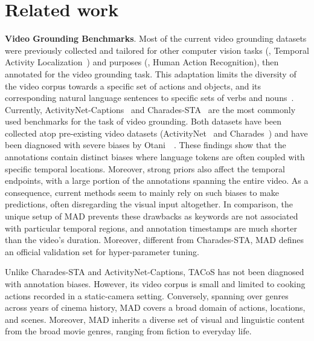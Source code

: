 \documentclass[10pt,twocolumn,letterpaper]{article}
\renewcommand{\paragraph}[1]{\vspace{1mm}\noindent\textbf{#1}.}
\begin{document}
 \section{Related work}\label{sec: related}

\paragraph{Video Grounding Benchmarks}
Most of the current video grounding datasets were previously collected and tailored for other computer vision tasks (\ie, Temporal Activity Localization~\cite{7298698, TACoS_ACL_2013}) and purposes (\ie, Human Action Recognition), then annotated for the video grounding task. This adaptation limits the diversity of the video corpus towards a specific set of actions and objects, and its corresponding natural language sentences to specific sets of verbs and nouns~\cite{rohrbach2014coherent, Krishna_2017_ICCV, Gao_2017_ICCV, otani2020challengesmr}. Currently, ActivityNet-Captions~\cite{Krishna_2017_ICCV} and Charades-STA~\cite{Gao_2017_ICCV} are the most commonly used benchmarks for the task of video grounding. Both datasets have been collected atop pre-existing video datasets (ActivityNet~\cite{7298698} and Charades~\cite{10.1007/978-3-319-46448-0_31}) and have been diagnosed with severe biases by Otani~\etal~\cite{otani2020challengesmr}. These findings show that the annotations contain distinct biases where language tokens are often coupled with specific temporal locations. Moreover, strong priors also affect the temporal endpoints, with a large portion of the annotations spanning the entire video. As a consequence, current methods seem to mainly rely on such biases to make predictions, often disregarding the visual input altogether. In comparison, the unique setup of MAD prevents these drawbacks as keywords are not associated with particular temporal regions, and annotation timestamps are much shorter than the video's duration.  Moreover, different from Charades-STA, MAD defines an official validation set for hyper-parameter tuning. 

Unlike Charades-STA and ActivityNet-Captions, TACoS \cite{TACoS_ACL_2013} has not been diagnosed with annotation biases. However, its video corpus is small and limited to cooking actions recorded in a static-camera setting. Conversely, spanning over  genres across  years of cinema history, MAD covers a broad domain of actions, locations, and scenes. 
Moreover, MAD inherits a diverse set of visual and linguistic content from the broad movie genres, ranging from fiction to everyday life.
\end{document}
